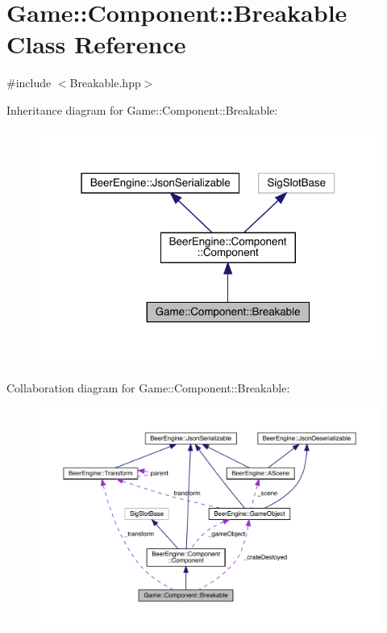 \hypertarget{class_game_1_1_component_1_1_breakable}{}\section{Game\+:\+:Component\+:\+:Breakable Class Reference}
\label{class_game_1_1_component_1_1_breakable}


{\ttfamily \#include $<$Breakable.\+hpp$>$}



Inheritance diagram for Game\+:\+:Component\+:\+:Breakable\+:
\nopagebreak
\begin{figure}[H]
\begin{center}
\leavevmode
\includegraphics[width=316pt]{class_game_1_1_component_1_1_breakable__inherit__graph}
\end{center}
\end{figure}


Collaboration diagram for Game\+:\+:Component\+:\+:Breakable\+:
\nopagebreak
\begin{figure}[H]
\begin{center}
\leavevmode
\includegraphics[width=350pt]{class_game_1_1_component_1_1_breakable__coll__graph}
\end{center}
\end{figure}
